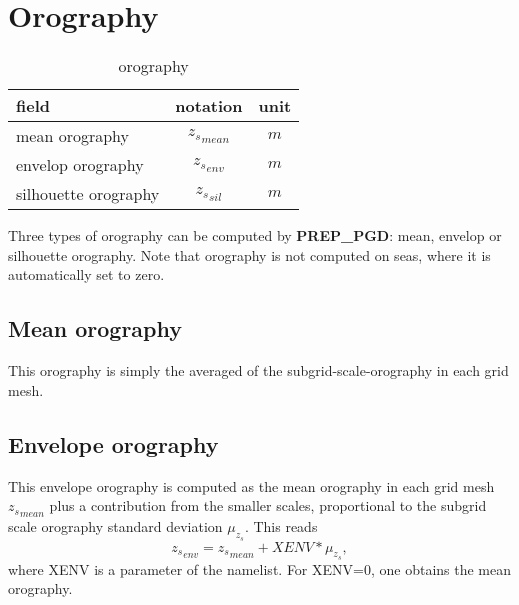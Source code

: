 \newpage

\section{Orography}

\begin{table}[h]
\hspace*{3.cm}
\begin{tabular}{||l|c|c||}
\hline
\hline
field & notation &  unit \\
\hline
\hline
mean orography       & ${z_s}_{mean}$ & $m$ \\
envelop orography    & ${z_s}_{env} $ & $m$ \\
silhouette orography & ${z_s}_{sil} $ & $m$ \\
\hline
\hline
\end{tabular}
\caption{orography
\label{paramZS}}
\end{table}

Three types of orography can be computed by {\bf PREP\_PGD}: mean, envelop or
silhouette orography. Note that orography
is not computed on seas, where it is automatically set to zero.

\subsection{Mean orography}
This orography is simply the averaged of the subgrid-scale-orography in each
grid mesh.

\subsection{Envelope orography}
This envelope orography is computed as the mean orography in each grid mesh
${z_s}_{mean}$ plus a contribution from the smaller scales, proportional
to the subgrid scale orography standard deviation $\mu_{z_s}$. This reads
\begin{equation}
{z_s}_{env}={z_s}_{mean} + XENV * \mu_{z_s},
\end{equation}
where XENV is a parameter of the namelist. For XENV=0,
one obtains the mean orography.


